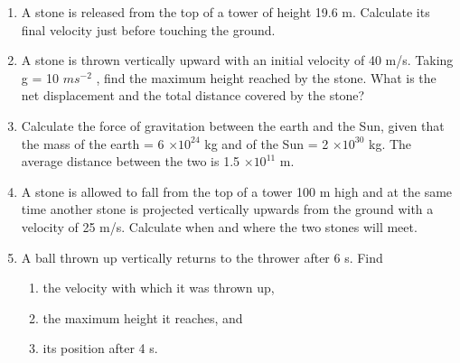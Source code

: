\begin{enumerate}[label=\arabic*.,ref=\thesubsection.\theenumi]
\item  A stone is released from the top of a tower of height 19.6 m. Calculate its final velocity just before touching the ground.
\item  A stone is thrown vertically upward with an initial velocity of 40 m/s. Taking g = 10 $ms^{-2}$
, find the maximum height reached
by the stone. What is the net displacement and the total distance covered by the stone?
\item  Calculate the force of gravitation between the earth and the Sun, given that the mass of the earth = 6 $\times 10^{24}$
kg and of the
Sun = 2 $\times 10^{30}$ kg. The average distance between the two is 1.5 $\times 10^{11}$
m.
\item  A stone is allowed to fall from the top of a tower 100 m high and at the same time another stone is projected vertically upwards from the ground with a velocity of 25 m/s. Calculate when and where the two stones will meet.
\item  A ball thrown up vertically returns to the thrower after 6 s. Find
\begin{enumerate} 
\item the velocity with which it was thrown up, 
\item the maximum height it reaches, and 
\item  its position after 4 s.
\end{enumerate}


\end{enumerate}
